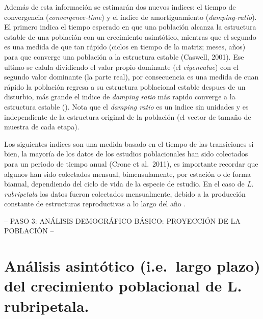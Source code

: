 \documentclass[
]{book}
\theoremstyle{definition}
\theoremstyle{definition}
\theoremstyle{definition}
\theoremstyle{definition}
\theoremstyle{remark}
\begin{document}
Además de esta información se estimarán dos nuevos indices: el tiempo de convergencia (\emph{convergence-time}) y el índice de amortiguamiento (\emph{damping-ratio}). El primero indica el tiempo esperado en que una población alcanza la estructura estable de una población con un crecimiento asimtótico, mientras que el segundo es una medida de que tan rápido (ciclos en tiempo de la matriz; meses, años) para que converge una población a la estructura estable (Caswell, 2001). Ese ultimo se calula dividiendo el valor propio dominante (el \emph{eigenvalue}) con el segundo valor dominante (la parte real), por consecuencia es una medida de cuan rápido la población regresa a su estructura poblacional estable despues de un disturbio, más grande el indice de \emph{damping ratio} más rapido converge a la estructura estable (\citet{stott2011framework}). Nota que el \emph{damping ratio} es un indice sin unidades y es independiente de la estructura original de la población (el vector de tamaño de muestra de cada etapa).

Los siguientes indices son una medida basado en el tiempo de las transiciones si bien, la mayoría de los datos de los estudios poblacionales han sido colectados para un periodo de tiempo anual (Crone et al.~2011), es importante recordar que algunos han sido colectados mensual, bimensulamente, por estación o de forma bianual, dependiendo del ciclo de vida de la especie de estudio. En el caso de \emph{L. rubripetala} los datos fueron colectados mensualmente, debido a la producción constante de estructuras reproductivas a lo largo del año \citep{tremblay2015stable}.

-- PASO 3: ANÁLISIS DEMOGRÁFICO BÁSICO: PROYECCIÓN DE LA POBLACIÓN --

\section{Análisis asintótico (i.e.~largo plazo) del crecimiento poblacional de L. rubripetala.}\label{anuxe1lisis-asintuxf3tico-i.e.-largo-plazo-del-crecimiento-poblacional-de-l.-rubripetala.}
\end{document}
